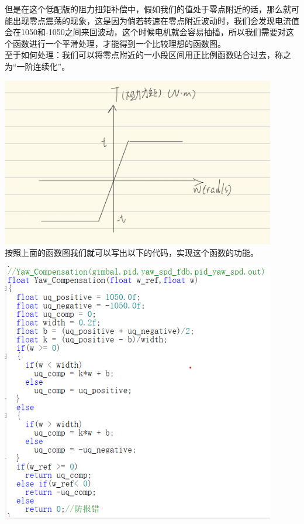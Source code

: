 \documentclass[UTF8,a4paper,12pt]{ctexart}
\begin{document}
        \begin{flushleft}
         但是在这个低配版的阻力扭矩补偿中，假如我们的值处于零点附近的话，那么就可能出现零点震荡的现象，这是因为倘若转速在零点附近波动时，我们会发现电流值会在1050和-1050之间来回波动，这个时候电机就会容易抽搐，所以我们需要对这个函数进行一个平滑处理，才能得到一个比较理想的函数图。\\
         至于如何处理：我们可以将零点附近的一小段区间用正比例函数贴合过去，称之为“一阶连续化”。
         \par \includegraphics[width=12cm]{picture/linearization_yaw.png}\\
         按照上面的函数图我们就可以写出以下的代码，实现这个函数的功能。\\
         \par \includegraphics[width=12cm]{picture/yaw_compensation_code.png}\\
        
        \end{flushleft}
\end{document}
